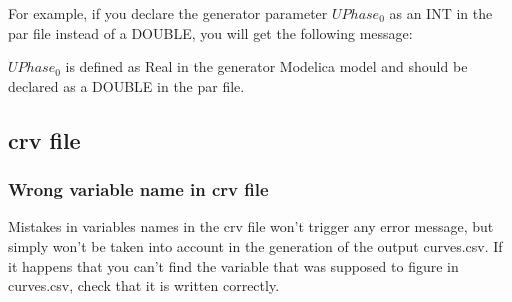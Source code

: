\documentclass[a4paper, 12pt]{report}
\begin{document}
For example, if you declare the generator parameter $UPhase_0$ as an INT in the par file instead of a DOUBLE, you will get the following message:
\vspace{0.6cm} %


$UPhase_0$ is defined as Real in the generator Modelica model and should be declared as a DOUBLE in the par file.

\subsection{crv file}

\subsubsection{Wrong variable name in crv file}

Mistakes in variables names in the crv file won't trigger any error message, but simply won't be taken into account in the generation of the output curves.csv. If it happens that you can't find the variable that was supposed to figure in curves.csv, check that it is written correctly.
\end{document}
